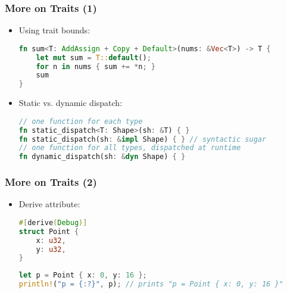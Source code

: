 \begin{frame}[fragile]
    \frametitle{More on Traits (1)}

    \begin{itemize}
        \item Using trait bounds:
        \begin{lstlisting}[language=rust]
fn sum<T: AddAssign + Copy + Default>(nums: &Vec<T>) -> T {
    let mut sum = T::default();
    for n in nums { sum += *n; }
    sum
}
        \end{lstlisting}

        \pause

        \item Static vs. dynamic dispatch:
        \begin{lstlisting}[language=rust]
// one function for each type
fn static_dispatch<T: Shape>(sh: &T) { }
fn static_dispatch(sh: &impl Shape) { } // syntactic sugar
// one function for all types, dispatched at runtime
fn dynamic_dispatch(sh: &dyn Shape) { }
        \end{lstlisting}
    \end{itemize}
\end{frame}

\begin{frame}[fragile]
    \frametitle{More on Traits (2)}

    \begin{itemize}
        \item Derive attribute:
        \begin{lstlisting}[language=rust]
#[derive(Debug)]
struct Point {
    x: u32,
    y: u32,
}
        \end{lstlisting}

        \pause

        \begin{lstlisting}[language=rust]
let p = Point { x: 0, y: 16 };
println!("p = {:?}", p); // prints "p = Point { x: 0, y: 16 }"
        \end{lstlisting}
    \end{itemize}
\end{frame}


